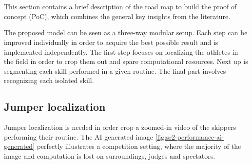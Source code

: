 
\chapter{}%
\label{ch:methodologie}


This section contains a brief description of the road map to build the proof of concept (PoC), which combines the general key insights from the literature.

The proposed model can be seen as a three-way modular setup. Each step can be improved individually in order to acquire the best possible result and is implemented independently.
The first step focuses on localizing the athletes in the field in order to crop them out and spare computational resources. Next up is segmenting each skill performed in a given routine. The final part involves recognizing each isolated skill.


\section{Jumper localization}

Jumper localization is needed in order crop a zoomed-in video of the skippers performing their routine. The AI generated image \ref{fig:sr2-performance-ai-generated} perfectly illustrates a competition setting, where the majority of the image and computation is lost on surroundings, judges and spectators.

